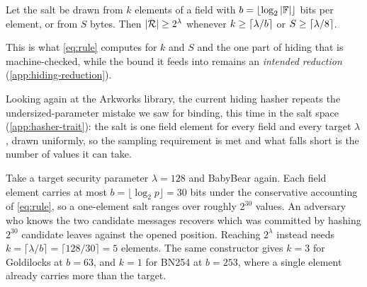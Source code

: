 \begin{proposition}\label{prop:salt-card}
Let the salt be drawn from $k$ elements of a field with $b=\lfloor\log_2|\mathbb{F}|\rfloor$
bits per element, or from $S$ bytes.  Then $|\mathcal{R}|\ge2^{\lambda}$ whenever
$k\ge\lceil\lambda/b\rceil$ or $S\ge\lceil\lambda/8\rceil$.
\end{proposition}

This is what \cref{eq:rule} computes for $k$ and $S$ and the one part of hiding that is
machine-checked, while the bound it feeds into remains an \emph{intended reduction}
(\cref{app:hiding-reduction}).

Looking again at the Arkworks library, the current hiding hasher repeats the
undersized-parameter mistake we saw for binding, this time in the salt space
(\cref{app:hasher-trait}): the salt is one field element for every field and every target
$\lambda$, drawn uniformly, so the sampling requirement is met and what falls short is the
number of values it can take.

Take a target security parameter $\lambda=128$ and BabyBear again.  Each field element
carries at most $b=\lfloor\log_2 p\rfloor=30$ bits under the conservative accounting of
\cref{eq:rule}, so a one-element salt ranges over roughly $2^{30}$ values.  An
adversary who knows the two candidate messages recovers which was committed by hashing
$2^{30}$ candidate leaves against the opened position.  Reaching $2^{\lambda}$ instead needs
$k=\lceil\lambda/b\rceil=\lceil128/30\rceil=5$ elements.  The same constructor gives
$k=3$ for Goldilocks at $b=63$, and $k=1$ for BN254 at $b=253$, where a single element
already carries more than the target.
